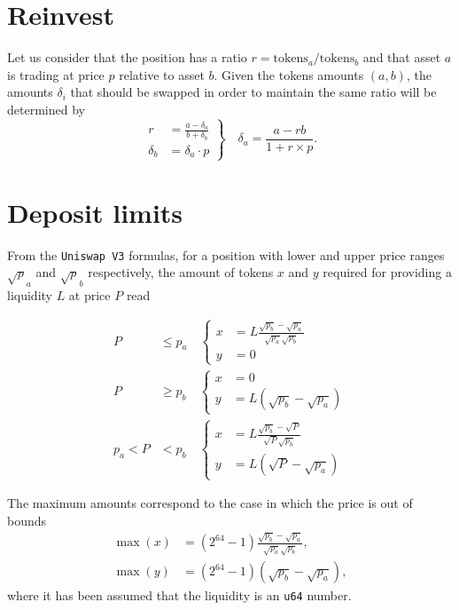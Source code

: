 \documentclass[a4paper]{article}
\begin{document}
\section{Reinvest}
Let us consider that the position has a ratio
\( r = {\text{tokens}_a}/{\text{tokens}_b} \)
and that asset \(a\) is trading at price \(p\) relative to asset \(b\).
Given the tokens amounts \((a,b)\), the amounts \(\delta_i\) that should be swapped in order to maintain the same ratio will be determined by
\begin{equation}
	\left.
	\begin{aligned}
		r        & = \frac{a - \delta_a}{b+\delta_b} \\
		\delta_b & = \delta_a  \cdot p
	\end{aligned}
	\right\} \quad \delta_a  = \frac{a - r b}{1 + r \times p}.
\end{equation}


\section{Deposit limits}
From the \texttt{Uniswap~V3} formulas, for a position with lower and upper price ranges \(\sqrt p_a\) and \(\sqrt p_b\) respectively, the amount of tokens \(x\) and \(y\) required for providing a liquidity \(L\) at price \(P\) read

\begin{equation}
	\begin{aligned}
		P       & \le p_a \quad \left\{ \begin{aligned}
			x & = L \frac{\sqrt{p_b} - \sqrt{p_a}}{\sqrt{p_a} \sqrt{p_b}} \\
			y & = 0
		\end{aligned} \right. \\
		P       & \ge p_b \quad \left\{ \begin{aligned}
			x & = 0                                      \\
			y & = L \left(\sqrt{p_b} - \sqrt{p_a}\right)
		\end{aligned} \right. \\
		p_a < P & < p_b \quad \left\{ \begin{aligned}
			x & = L \frac{\sqrt{p_b} - \sqrt{P}}{\sqrt{P} \sqrt{p_b}} \\
			y & = L \left(\sqrt{P} - \sqrt{p_a}\right)
		\end{aligned} \right.
	\end{aligned}
\end{equation}


The maximum amounts correspond to the case in which the price is out of bounds
\begin{align}
	\max(x) & = (2^{64}-1) \frac{\sqrt{p_b} - \sqrt{p_a}}{\sqrt{p_a} \sqrt{p_b}}, \\
	\max(y) & = (2^{64}-1) \left(\sqrt{p_b} - \sqrt{p_a}\right),
\end{align}
where it has been assumed that the liquidity is an \texttt{u64} number.
\end{document}
